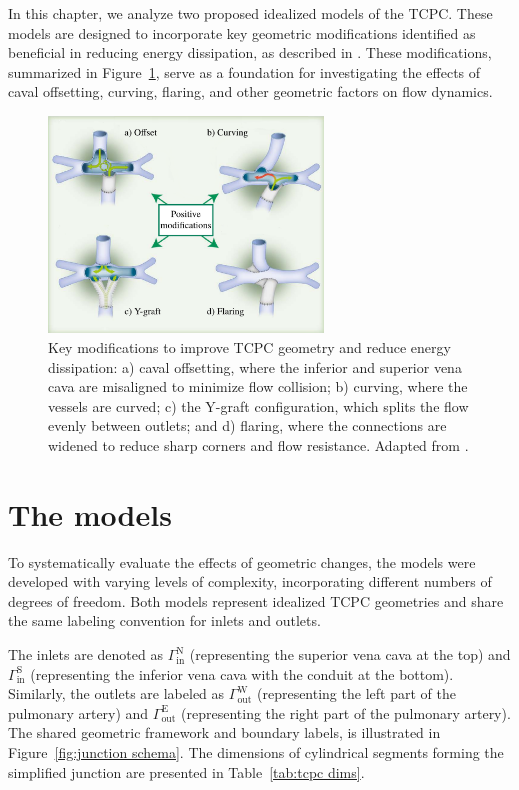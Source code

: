 In this chapter, we analyze two proposed idealized models of the TCPC. These models are designed to incorporate key geometric modifications identified as beneficial in reducing energy dissipation, as described in \cite{Rijnberg2018}. These modifications, summarized in Figure~\ref{fig:positive_modifications}, serve as a foundation for investigating the effects of caval offsetting, curving, flaring, and other geometric factors on flow dynamics.

\begin{figure}[H]
	\centering
	\vspace{3mm}
	\includegraphics[width=0.65\textwidth]{figures/energyloss-en.pdf}
	\vspace{3mm}
	\caption[Positive Modifications for TCPC]{Key modifications to improve TCPC geometry and reduce energy dissipation: a) caval offsetting, where the inferior and superior vena cava are misaligned to minimize flow collision; b) curving, where the vessels are curved; c) the Y-graft configuration, which splits the flow evenly between outlets; and d) flaring, where the connections are widened to reduce sharp corners and flow resistance. Adapted from \cite{Rijnberg2018}.}
	\label{fig:positive_modifications}
\end{figure}

\section{The models}

To systematically evaluate the effects of geometric changes, the models were developed with varying levels of complexity, incorporating different numbers of degrees of freedom. Both models represent idealized TCPC geometries and share the same labeling convention for inlets and outlets. 

The inlets are denoted as $\Gamma^{\text{N}}_{\text{in}}$ (representing the superior vena cava at the top) and $\Gamma^{\text{S}}_{\text{in}}$ (representing the inferior vena cava with the conduit at the bottom). Similarly, the outlets are labeled as $\Gamma^{\text{W}}_{\text{out}}$ (representing the left part of the pulmonary artery) and $\Gamma^{\text{E}}_{\text{out}}$ (representing the right part of the pulmonary artery).
The shared geometric framework and boundary labels, is illustrated in Figure~\ref{fig:junction schema}. The dimensions of cylindrical segments forming the simplified junction are presented in Table~\ref{tab:tcpc dims}.


